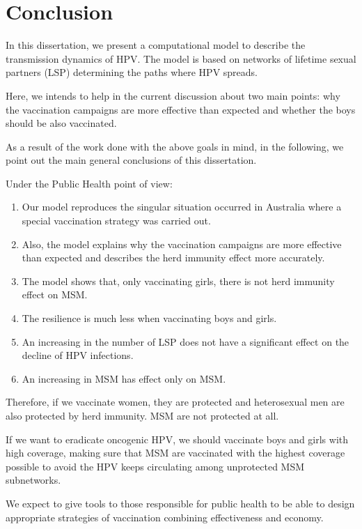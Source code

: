 \chapter{Conclusion}\label{conclusion}
In this dissertation, we present a computational model to describe the transmission dynamics of HPV. The model is based on networks of lifetime sexual partners (LSP) determining the paths where HPV spreads.

Here, we intends to help in the current discussion about two main points: why the vaccination campaigns are more effective than expected and whether the boys should be also vaccinated.  

As a result of the work done with the above goals in mind, in the following, we point out the main general conclusions of this dissertation.

Under the Public Health point of view:
\begin{enumerate}
	\item Our model reproduces the singular situation occurred in Australia where a special vaccination strategy was carried out.
	\item Also, the model explains why the vaccination campaigns are more effective than expected and describes the herd immunity effect more accurately.
	\item The model shows that, only vaccinating girls, there is not herd immunity effect on MSM.
	\item The resilience is much less when vaccinating boys and girls. 
	\item An increasing in the number of LSP does not have a significant effect on the decline of HPV infections.
	\item An increasing in MSM has effect only on MSM.
\end{enumerate}

Therefore, if we vaccinate women, they are protected and heterosexual men are also protected by herd immunity. MSM are not protected at all.

If we want to eradicate oncogenic HPV, we should vaccinate boys and girls with high coverage, making sure that MSM are vaccinated with the highest coverage possible to avoid the HPV keeps circulating among unprotected MSM subnetworks.

We expect to give tools to those responsible for public health to be able to design appropriate strategies of vaccination combining effectiveness and economy.

